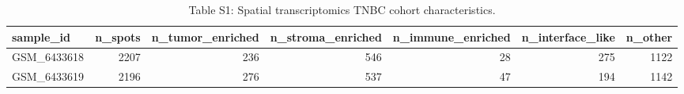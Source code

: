 \begin{table}
\caption{Table S1: Spatial transcriptomics TNBC cohort characteristics.}
\label{tab:tnbc_samples_overview}
\begin{tabular}{lrrrrrr}
\toprule
sample_id & n_spots & n_tumor_enriched & n_stroma_enriched & n_immune_enriched & n_interface_like & n_other \\
\midrule
GSM_6433618 & 2207 & 236 & 546 & 28 & 275 & 1122 \\
GSM_6433619 & 2196 & 276 & 537 & 47 & 194 & 1142 \\
\bottomrule
\end{tabular}
\end{table}
